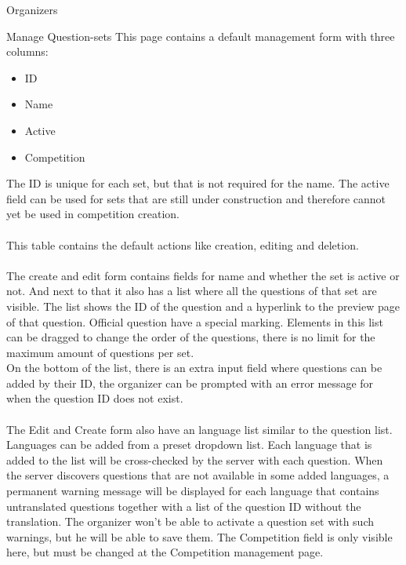 \begin{section}{Organizers}
	\begin{subsection}{Manage Question-sets}
		This page contains a default management form with three columns:
		\begin{itemize}
			\item ID
			\item Name
			\item Active
			\item Competition
		\end{itemize}
		The ID is unique for each set, but that is not required for the name. The active
		field can be used for sets that are still under construction and therefore cannot
		yet be used in competition creation.\\
		\\
		This table contains the default actions like creation, editing and deletion. \\
		\\
		The create and edit form contains fields for name and whether the set is active or
		not. And next to that it also has a list where all the questions of that set are
		visible. The list shows the ID of the question and a hyperlink to the preview
		page of that question. Official question have a special marking. Elements in this
		list can be dragged to change the order of the questions, there is no limit for 
		the maximum amount of questions per set. \\
		On the bottom of the list, there is an extra input field where questions can be
		added by their ID, the organizer can be prompted with an error message for when
		the question ID does not exist. \\
		\\
		The Edit and Create form also have an language list similar to the question list.
		Languages can be added from a preset dropdown list. Each language that is added
		to the list will be cross-checked by the server with each question. When the
		server discovers questions that are not available in some added languages, a
		permanent warning message will be displayed for each language that contains
		untranslated questions together with a list of the question ID without the
		translation. The organizer won't be able to activate a question set with such
		warnings, but he will be able to save them. The Competition field is only visible
		here, but must be changed at the Competition management page.
		
	\end{subsection}
	

\end{section}
